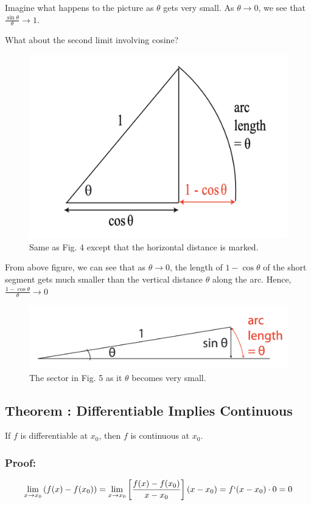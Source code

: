 Imagine what happens to the picture as $\theta$ gets very small.
As $\theta \to 0$, we see that $\frac{\sin \theta}{\theta} \to 1$.

\pagebreak

What about the second limit involving cosine?

\begin{figure}[ht!]
	\centering
	\includegraphics[scale=0.5]{./images/lecture_2_figure_3.png}
	\caption{Same as Fig. 4 except that the horizontal distance is marked.}    
\end{figure}


From above figure, we can see that as $\theta \to 0$, the length of $1-\cos \theta$ of the short segment gets much smaller than the vertical distance $\theta$ along the arc.
Hence, $\frac{1-\cos \theta}{\theta} \to 0$ 


\begin{figure}[ht!]
	\centering
	\includegraphics[scale=0.5]{./images/lecture_2_figure_4.png}
	\caption{The sector in Fig. 5 as it $\theta$ becomes very small.}    
\end{figure}

\subsection*{Theorem : Differentiable Implies Continuous}
If $f$ is differentiable at $x_0$, then $f$ is continuous at $x_0$.

\subsubsection*{Proof:} 

\begin{equation*}
\lim_{x \to x_0} \left( f(x) - f(x_0) \right)
	= \lim_{x \to x_0} \left[ \frac{f(x) - f(x_0)}{x-x_0} \right] (x - x_0) = f`(x-x_0) \cdot 0 = 0 
\end{equation*}
